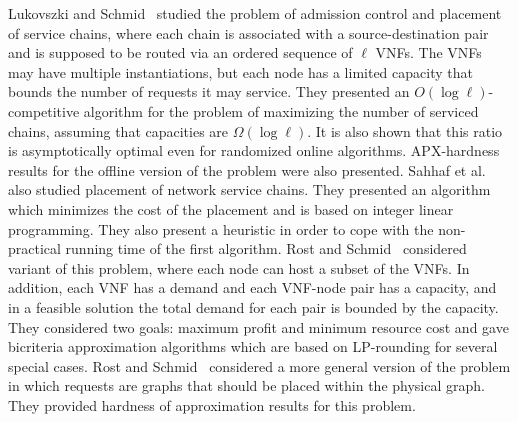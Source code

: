 \documentclass[11pt]{article}
\begin{document}
Lukovszki and Schmid~\cite{LukovszkiSchmid15} studied the problem of
admission control and placement of service chains, where each chain is
associated with a source-destination pair and is supposed to be routed
via an ordered sequence of $\ell$ VNFs.  The VNFs may have multiple
instantiations, but each node has a limited capacity that bounds the
number of requests it may service.
%
They presented an $O(\log \ell)$-competitive algorithm for the problem
of maximizing the number of serviced chains, assuming that capacities
are $\Omega(\log \ell)$.
It is also shown that this ratio is asymptotically optimal even for
randomized online algorithms.  APX-hardness results for the offline
version of the problem were also presented.
%
Sahhaf et al.~\cite{STRSCPD15} also studied placement of network
service chains.  They presented an algorithm which minimizes the cost
of the placement and is based on integer linear programming.  They
also present a heuristic in order to cope with the non-practical
running time of the first algorithm.
%
Rost and Schmid~\cite{RostSchmid16} considered variant of this
problem, where each node can host a subset of the VNFs.  In addition,
each VNF has a demand and each VNF-node pair has a capacity, and in a
feasible solution the total demand for each pair is bounded by the
capacity.  They considered two goals: maximum profit and minimum
resource cost and gave bicriteria approximation algorithms which are
based on LP-rounding for several special cases.
%
Rost and Schmid~\cite{RostSchmid18} considered a more general version
of the problem in which requests are graphs that should be placed
within the physical graph.  They provided hardness of approximation
results for this problem.
\end{document}

